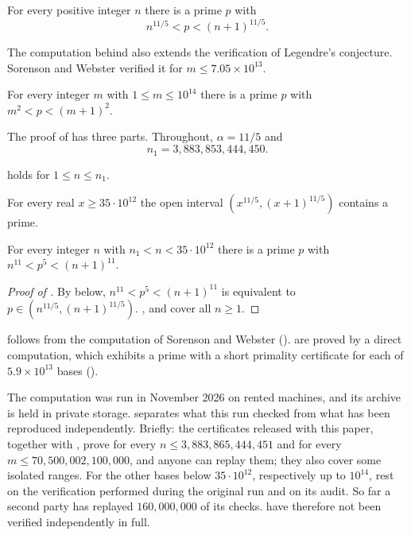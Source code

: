 \documentclass[11pt,colorlinks]{charlie}
\begin{document}
\begin{theorem}\label{thm:main}
For every positive integer $n$ there is a prime $p$ with
\[
 n^{11/5}<p<(n+1)^{11/5}.
\]
\end{theorem}

The computation behind  also extends the verification of Legendre's conjecture. Sorenson and Webster \cite{SW} verified it for $m\le7.05\times10^{13}$.

\begin{theorem}\label{thm:squares}
For every integer $m$ with $1\le m\le10^{14}$ there is a prime $p$ with $m^2<p<(m+1)^2$.
\end{theorem}

The proof of  has three parts. Throughout, $\alpha=11/5$ and
\[
 n_1=3{,}883{,}853{,}444{,}450 .
\]

\begin{proposition}\label{prop:low}
 holds for $1\le n\le n_1$.
\end{proposition}

\begin{theorem}\label{thm:outer}
For every real $x\ge35\cdot10^{12}$ the open interval $(x^{11/5},(x+1)^{11/5})$ contains a prime.
\end{theorem}

\begin{proposition}\label{prop:sweep}
For every integer $n$ with $n_1<n<35\cdot10^{12}$ there is a prime $p$ with $n^{11}<p^5<(n+1)^{11}$.
\end{proposition}

\begin{proof}[Proof of ]
By  below, $n^{11}<p^5<(n+1)^{11}$ is equivalent to $p\in(n^{11/5},(n+1)^{11/5})$. ,  and  cover all $n\ge1$.
\end{proof}

 follows from the computation of Sorenson and Webster ().  are proved by a direct computation, which exhibits a prime with a short primality certificate for each of $5.9\times10^{13}$ bases ().

The computation was run in November 2026 on rented machines, and its archive is held in private storage.  separates what this run checked from what has been reproduced independently. Briefly: the certificates released with this paper, together with \cite{SW}, prove  for every $n\le3{,}883{,}865{,}444{,}451$ and  for every $m\le70{,}500{,}002{,}100{,}000$, and anyone can replay them; they also cover some isolated ranges. For the other bases below $35\cdot10^{12}$, respectively up to $10^{14}$,  rest on the verification performed during the original run and on its audit. So far a second party has replayed $160{,}000{,}000$ of its checks.  have therefore not been verified independently in full.
\end{document}
